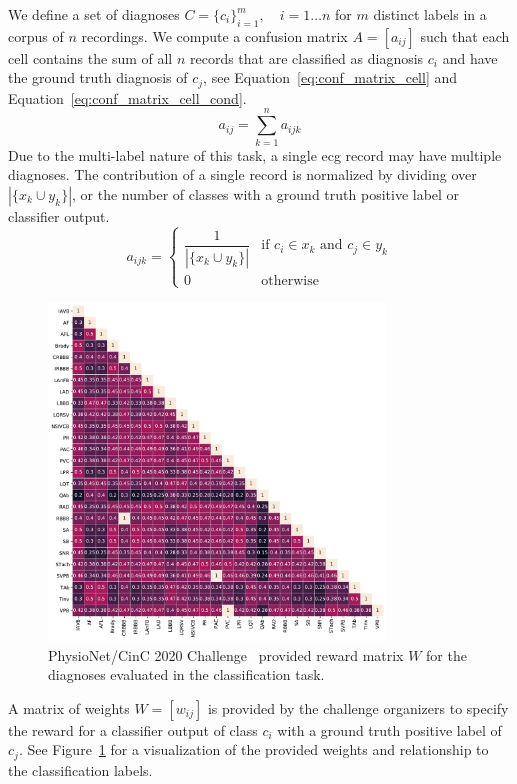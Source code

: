 \documentclass[\main/thesis.tex]{subfiles}
\begin{document}
We define a set of diagnoses $C={\{c_i\}}^m_{i=1}, \quad i = 1 \dots n$ for $m$ distinct labels in a corpus of $n$ recordings.
We compute a confusion matrix $A=[a_{ij}]$ such that each cell contains the sum of all $n$ records that are classified as diagnosis $c_i$ and have the ground truth diagnosis of $c_j$, see Equation~\ref{eq:conf_matrix_cell} and Equation~\ref{eq:conf_matrix_cell_cond}.
\begin{equation}
    a_{ij} = \sum^n_{k=1}{a_{ijk}} \label{eq:conf_matrix_cell}
\end{equation}
Due to the multi-label nature of this task, a single \gls{ecg} record may have multiple diagnoses.
The contribution of a single record is normalized by dividing over $|\{x_k \cup y_k \}|$, or the number of classes with a ground truth positive label or classifier output.
\begin{equation}
    a_{ijk} = \left\{\begin{array}{lr}
        \dfrac{1}{|\{x_k \cup y_k \}|} & \text{if } c_i \in x_k \text{ and } c_j \in y_k \\
        0 & \text{otherwise}
    \end{array} \right. \label{eq:conf_matrix_cell_cond}
\end{equation}

\begin{figure}[ht]
    \centering
    \includegraphics[trim={0.3cm 0.3cm 0.3cm 0.3cm},clip,width=0.8\textwidth]{figure/aenc_label_weights.pdf}
    \caption{PhysioNet/CinC 2020 Challenge~\cite{physionet_challenge_2020} provided reward matrix $W$ for the diagnoses evaluated in the classification task.}
    \label{fig:reward_matrix}
\end{figure}
A matrix of weights $W=[w_{ij}]$ is provided by the challenge organizers to specify the reward for a classifier output of class $c_i$ with a ground truth positive label of $c_j$.
See Figure~\ref{fig:reward_matrix} for a visualization of the provided weights and relationship to the classification labels.
\end{document}
